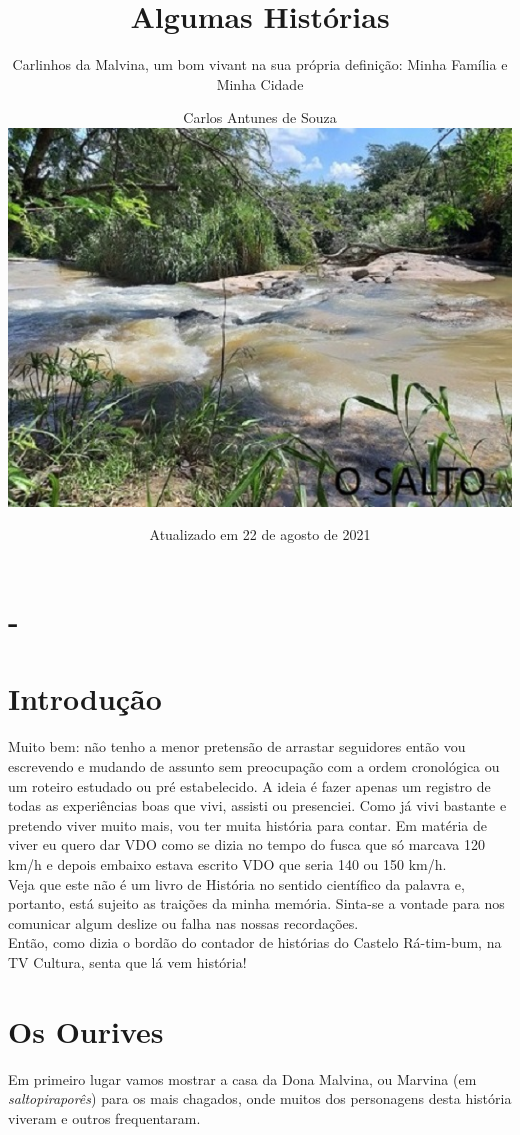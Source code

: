 \documentclass[12pt,brazil,]{book}
\title{Algumas Histórias}
\subtitle{Carlinhos da Malvina, um bom vivant na sua própria definição: Minha
Família e Minha Cidade}
\author{Carlos Antunes de Souza

\includegraphics{Imagens/OSALTOB.JPEG}}
\date{Atualizado em 22 de agosto de 2021}
\begin{document}
\maketitle

{
\setcounter{tocdepth}{1}
\tableofcontents
}
\chapter*{-}\label{section}

\chapter*{Introdução}\label{introduuxe7uxe3o}

Muito bem: não tenho a menor pretensão de arrastar seguidores então vou
escrevendo e mudando de assunto sem preocupação com a ordem cronológica
ou um roteiro estudado ou pré estabelecido. A ideia é fazer apenas um
registro de todas as experiências boas que vivi, assisti ou presenciei.
Como já vivi bastante e pretendo viver muito mais, vou ter muita
história para contar. Em matéria de viver eu quero dar VDO como se dizia
no tempo do fusca que só marcava 120 km/h e depois embaixo estava
escrito VDO que seria 140 ou 150 km/h.\\
Veja que este não é um livro de História no sentido científico da
palavra e, portanto, está sujeito as traições da minha memória. Sinta-se
a vontade para nos comunicar algum deslize ou falha nas nossas
recordações.\\
Então, como dizia o bordão do contador de histórias do Castelo
Rá-tim-bum, na TV Cultura, senta que lá vem história!

\chapter{Os Ourives}\label{os-ourives}

Em primeiro lugar vamos mostrar a casa da Dona Malvina, ou Marvina (em
\emph{saltopiraporês}) para os mais chagados, onde muitos dos
personagens desta história viveram e outros frequentaram.
\end{document}
